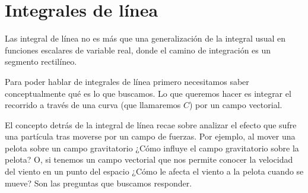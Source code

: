 \section{Integrales de línea}

Las integral de línea no es más que una generalización de la integral usual en funciones escalares de variable real, donde el camino de integración es un segmento rectilíneo.

Para poder hablar de integrales de línea primero necesitamos saber conceptualmente qué es lo que buscamos. Lo que queremos hacer es integrar el recorrido a través de una curva (que llamaremos $C$) por un campo vectorial. 

El concepto detrás de la integral de línea recae sobre analizar el efecto que sufre una partícula tras moverse por un campo de fuerzas. Por ejemplo, al mover una pelota sobre un campo gravitatorio ¿Cómo influye el campo gravitatorio sobre la pelota? O, si tenemos un campo vectorial que nos permite conocer la velocidad del viento en un punto del espacio ¿Cómo le afecta el viento a la pelota cuando se mueve? Son las preguntas que buscamos responder.

